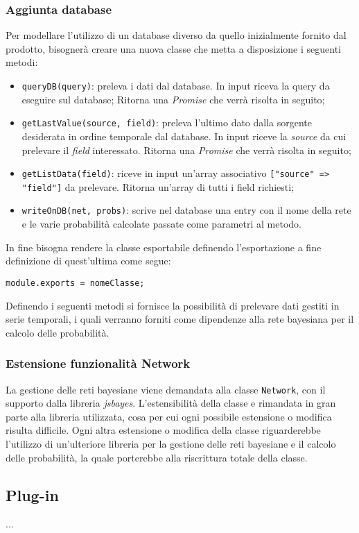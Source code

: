 \begin{itemize}
\subsubsection{Aggiunta database}
Per modellare l'utilizzo di un database diverso da quello inizialmente fornito dal prodotto, bisognerà creare una nuova classe che metta a disposizione i seguenti metodi: 
\begin{itemize}
 \item \texttt{queryDB(query)}: preleva i dati dal database. In input riceva la query da eseguire sul database;
 Ritorna una \textit{Promise} che verrà risolta in seguito;
 \item \texttt{getLastValue(source, field)}: preleva l'ultimo dato dalla sorgente desiderata in ordine temporale dal database. In input riceve la \textit{source} da cui prelevare il \textit{field} interessato. Ritorna una \textit{Promise} che verrà risolta in seguito;
 \item \texttt{getListData(field)}: riceve in input un'array associativo \texttt{["source" => "field"]} da prelevare. 
 Ritorna un'array di tutti i field richiesti;
 \item \texttt{writeOnDB(net, probs)}: scrive nel database una entry con il nome della rete e le varie probabilità calcolate passate come parametri al metodo.
\end{itemize}
In fine bisogna rendere la classe esportabile definendo l'esportazione a fine definizione di quest'ultima come segue: 
\begin{center}
 \texttt{module.exports = nomeClasse;}
\end{center}
Definendo i seguenti metodi si fornisce la possibilità di prelevare dati gestiti in serie temporali, i quali verranno forniti come dipendenze alla rete bayesiana per il calcolo delle probabilità. 

\end{itemize}

\subsubsection{Estensione funzionalità Network}
La gestione delle reti bayesiane viene  demandata alla classe \texttt{Network}, con il supporto dalla libreria \textit{jsbayes}. L'estensibilità della classe e rimandata in gran parte alla libreria utilizzata, cosa per cui ogni possibile estensione o modifica risulta difficile. Ogni altra estensione o modifica della classe riguarderebbe l'utilizzo di un'ulteriore libreria per la gestione delle reti bayesiane e il calcolo delle probabilità, la quale porterebbe alla riscrittura totale della classe. 


\subsection{Plug-in}

...